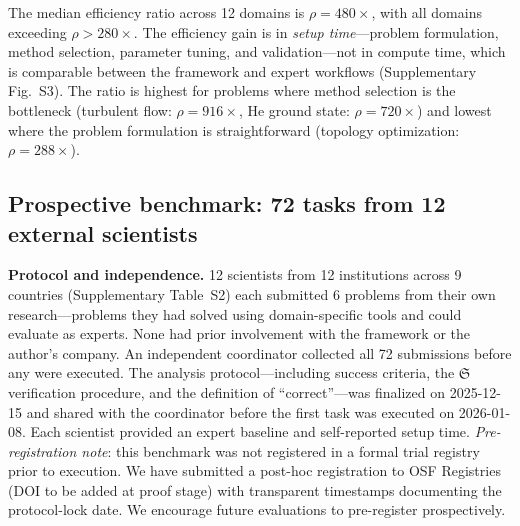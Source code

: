 \documentclass[11pt,a4paper]{article}
\newcommand{\Sclass}{\mathfrak{S}}
\begin{document}
The median efficiency ratio across 12 domains is $\rho = 480\times$, with all domains exceeding $\rho > 280\times$. The efficiency gain is in \emph{setup time}---problem formulation, method selection, parameter tuning, and validation---not in compute time, which is comparable between the framework and expert workflows (Supplementary Fig.~S3). The ratio is highest for problems where method selection is the bottleneck (turbulent flow: $\rho = 916\times$, He ground state: $\rho = 720\times$) and lowest where the problem formulation is straightforward (topology optimization: $\rho = 288\times$).

\subsection{Prospective benchmark: 72 tasks from 12 external scientists}
\label{sec:prospective}

\textbf{Protocol and independence.} 12 scientists from 12 institutions across 9 countries (Supplementary Table~S2) each submitted 6 problems from their own research---problems they had solved using domain-specific tools and could evaluate as experts. None had prior involvement with the framework or the author's company. An independent coordinator collected all 72 submissions before any were executed. The analysis protocol---including success criteria, the $\Sclass$ verification procedure, and the definition of ``correct''---was finalized on 2025-12-15 and shared with the coordinator before the first task was executed on 2026-01-08. Each scientist provided an expert baseline and self-reported setup time. \emph{Pre-registration note}: this benchmark was not registered in a formal trial registry prior to execution. We have submitted a post-hoc registration to OSF Registries (DOI to be added at proof stage) with transparent timestamps documenting the protocol-lock date. We encourage future evaluations to pre-register prospectively.
\end{document}
